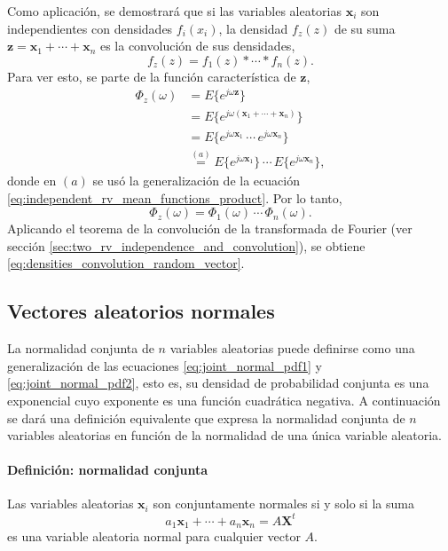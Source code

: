 \documentclass[a4paper]{report}
\newcommand{\X}{\mathbf{X}}
\newcommand{\x}{\mathbf{x}}
\newcommand{\z}{\mathbf{z}}
\begin{document}
Como aplicación, se demostrará que si las variables aleatorias \(\x_i\) son independientes con densidades \(f_i(x_i)\), la densidad \(f_z(z)\) de su suma \(\z=\x_1+\cdots+\x_n\) es la convolución de sus densidades,
\begin{equation}\label{eq:densities_convolution_random_vector}
 f_z(z)=f_1(z)*\cdots*f_n(z).
\end{equation}
Para ver esto, se parte de la función característica de \(\z\),
\begin{align*}
 \Phi_z(\omega)&=E\{e^{j\omega\z}\}\\
   &=E\{e^{j\omega(\x_1+\cdots+\x_n)}\}\\
   &=E\{e^{j\omega\x_1}\,\cdots\,e^{j\omega\x_n}\}\\
   &\overset{(a)}{=}E\{e^{j\omega\x_1}\}\,\cdots\,E\{e^{j\omega\x_n}\},
\end{align*}
donde en \((a)\) se usó la generalización de la ecuación \ref{eq:independent_rv_mean_functions_product}. Por lo tanto,
\begin{equation}\label{eq:characteristic_function_product_random_vector}
 \Phi_z(\omega)=\Phi_1(\omega)\,\cdots\,\Phi_n(\omega).
\end{equation}
Aplicando el teorema de la convolución de la transformada de Fourier (ver sección \ref{sec:two_rv_independence_and_convolution}), se obtiene \ref{eq:densities_convolution_random_vector}.

\subsection{Vectores aleatorios normales}\label{sec:normal_random_vectors}

La normalidad conjunta de \(n\) variables aleatorias puede definirse como una generalización de las ecuaciones \ref{eq:joint_normal_pdf1} y \ref{eq:joint_normal_pdf2}, esto es, su densidad de probabilidad conjunta es una exponencial cuyo exponente es una función cuadrática negativa. A continuación se dará una definición equivalente que expresa la normalidad conjunta de \(n\) variables aleatorias en función de la normalidad de una única variable aleatoria.

\paragraph{Definición: normalidad conjunta} Las variables aleatorias \(\x_i\) son conjuntamente normales si y solo si la suma
\[
 a_1\x_1+\cdots+a_n\x_n=A\X^t
\]
es una variable aleatoria normal para cualquier vector \(A\).
\end{document}

